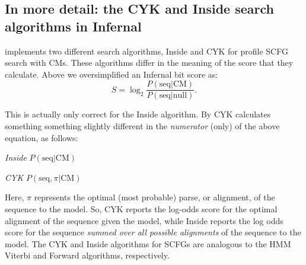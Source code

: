\begin{comment}
\subsubsection{\textsc{Warning:} Using negative bit score thresholds for local searches}
If the bit score threshold you use with local searches lower than
 $-5$,  you may begin to observe some strange
behavior. At a $-10$ bit threshold, \prog{cmsearch} will start to report
hits of a single residue in the target, that are clearly not
homologous sequences. This is because the local
alignment of a single residue to an average sized CM scores about $-10$
bits. In general, for local searches the lowest recommended bit score
cutoff is about $-5$ bits. If you commonly use
E-value cutoffs for local searches, be sure to check that the bit
score threshold that corresponds to your E-value cutoff is at least $-5$
bits. In practice this should only happen if you use a high E-value
cutoff for a small target database, for example an E-value cutoff of
$1000$ for a $1000$ nucleotide database. This issue is specific 
to local searches, and does not apply to glocal searches (enabled with the
 \prog{-g} option). 
\end{comment}

\subsection{In more detail: the CYK and Inside search algorithms in Infernal}
 implements two different search algorithms, Inside and
CYK for profile SCFG search with CMs.  These algorithms differ in the
meaning of the score that they calculate. Above we oversimplified an
Infernal bit score as:
\[
	S = \log_2 \frac {P( \mbox{seq} | \mbox{CM})} { P (\mbox{seq} |
	\mbox{null})}.
\]

This is actually only correct for the Inside
algorithm. By CYK calculates something 
something slightly different in the \emph{numerator} (only) of the
above equation, as follows: 

\begin{wideitem}
\item[\em{Inside}]  $P(\mbox{seq}      | \mbox{CM})$
\item[\em{CYK}]     $P(\mbox{seq},\pi  | \mbox{CM})$
\end{wideitem}

Here, $\pi$ represents the optimal (most probable) parse, or
alignment, of the sequence to the model. So, CYK
reports the log-odds score for the optimal alignment 
of the sequence given the model, while
Inside reports the log odds score for the
sequence \emph{summed over all possible alignments} of the sequence to
the model. The CYK and Inside algorithms for SCFGs are analogous to
the HMM Viterbi and Forward algorithms, respectively.

